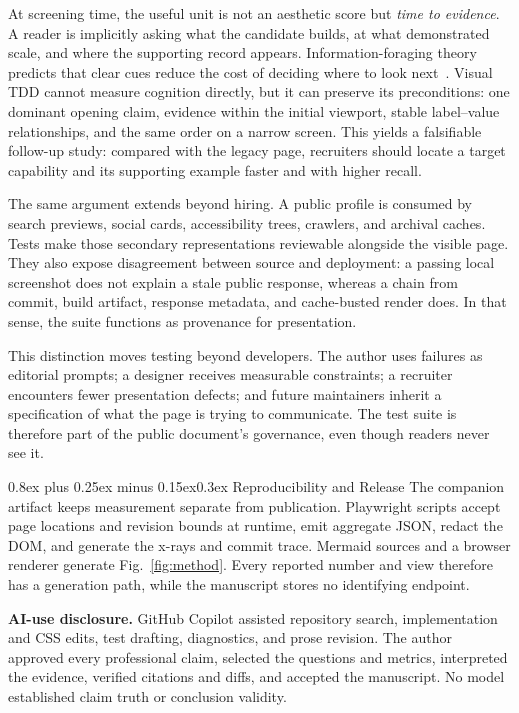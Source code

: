 \documentclass[9pt,twocolumn]{extarticle}
\makeatletter
\renewcommand{\section}{\@startsection{section}{1}{0pt}%
  {0.8ex plus 0.25ex minus 0.15ex}{0.3ex}%
  {\normalfont\large\bfseries\color{accent}}}
\makeatother
\begin{document}
At screening time, the useful unit is not an aesthetic score but \emph{time to evidence}. A reader is implicitly asking what the candidate builds, at what demonstrated scale, and where the supporting record appears. Information-foraging theory predicts that clear cues reduce the cost of deciding where to look next~\cite{pirolli1999}. Visual TDD cannot measure cognition directly, but it can preserve its preconditions: one dominant opening claim, evidence within the initial viewport, stable label--value relationships, and the same order on a narrow screen. This yields a falsifiable follow-up study: compared with the legacy page, recruiters should locate a target capability and its supporting example faster and with higher recall.

The same argument extends beyond hiring. A public profile is consumed by search previews, social cards, accessibility trees, crawlers, and archival caches. Tests make those secondary representations reviewable alongside the visible page. They also expose disagreement between source and deployment: a passing local screenshot does not explain a stale public response, whereas a chain from commit, build artifact, response metadata, and cache-busted render does. In that sense, the suite functions as provenance for presentation.

This distinction moves testing beyond developers. The author uses failures as editorial prompts; a designer receives measurable constraints; a recruiter encounters fewer presentation defects; and future maintainers inherit a specification of what the page is trying to communicate. The test suite is therefore part of the public document's governance, even though readers never see it.

\section{Reproducibility and Release}
The companion artifact keeps measurement separate from publication. Playwright scripts accept page locations and revision bounds at runtime, emit aggregate JSON, redact the DOM, and generate the x-rays and commit trace. Mermaid sources and a browser renderer generate Fig.~\ref{fig:method}. Every reported number and view therefore has a generation path, while the manuscript stores no identifying endpoint.

\textbf{AI-use disclosure.} GitHub Copilot assisted repository search, implementation and CSS edits, test drafting, diagnostics, and prose revision. The author approved every professional claim, selected the questions and metrics, interpreted the evidence, verified citations and diffs, and accepted the manuscript. No model established claim truth or conclusion validity.
\end{document}
